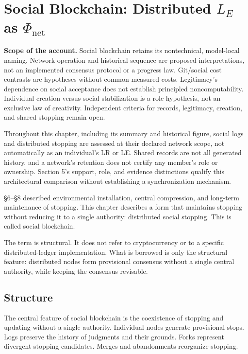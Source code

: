 \section{Social Blockchain: Distributed $L_E$ as $\Phi_{\text{net}}$}

\noindent\textbf{Scope of the account.} Social blockchain retains its nontechnical, model-local naming. Network operation and historical sequence are proposed interpretations, not an implemented consensus protocol or a progress law. Git/social cost contrasts are hypotheses without common measured costs. Legitimacy's dependence on social acceptance does not establish principled noncomputability. Individual creation versus social stabilization is a role hypothesis, not an exclusive law of creativity. Independent criteria for records, legitimacy, creation, and shared stopping remain open.

Throughout this chapter, including its summary and historical figure, social logs and distributed stopping are assessed at their declared network scope, not automatically as an individual's LR or LE. Shared records are not all generated history, and a network's retention does not certify any member's role or ownership. Section 5's support, role, and evidence distinctions qualify this architectural comparison without establishing a synchronization mechanism.


\S{}6--\S{}8 described environmental installation, central compression, and long-term maintenance of stopping. This chapter describes a form that maintains stopping without reducing it to a single authority: distributed social stopping. This is called social blockchain.

The term is structural. It does not refer to cryptocurrency or to a specific distributed-ledger implementation. What is borrowed is only the structural feature: distributed nodes form provisional consensus without a single central authority, while keeping the consensus revisable.

\subsection{Structure}

The central feature of social blockchain is the coexistence of stopping and updating without a single authority. Individual nodes generate provisional stops. Logs preserve the history of judgments and their grounds. Forks represent divergent stopping candidates. Merges and abandonments reorganize stopping.

